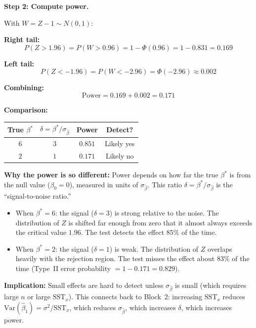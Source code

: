 \documentclass[11pt,a4paper]{article}
\begin{document}
\begin{enumerate}[label=(\alph*)]
\begin{solution}
\textbf{Step 2: Compute power.}

With $W = Z - 1 \sim N(0,1)$:

\textbf{Right tail:}
\[
  P(Z > 1.96) = P(W > 0.96) = 1 - \Phi(0.96) = 1 - 0.831 = 0.169
\]

\textbf{Left tail:}
\[
  P(Z < -1.96) = P(W < -2.96) = \Phi(-2.96) \approx 0.002
\]

\textbf{Combining:}
\[
  \text{Power} = 0.169 + 0.002 = \boxed{0.171}
\]

\textbf{Comparison:}

\medskip
\begin{center}
\begin{tabular}{cccc}
\toprule
True $\beta^*$ & $\delta = \beta^*/\sigma_{\hat{\beta}}$ & Power & Detect? \\
\midrule
$6$ & $3$ & $0.851$ & Likely yes \\
$2$ & $1$ & $0.171$ & Likely no \\
\bottomrule
\end{tabular}
\end{center}

\medskip
\textbf{Why the power is so different:} Power depends on how far the true $\beta^*$ is from the null value ($\beta_0 = 0$), measured in units of $\sigma_{\hat{\beta}}$. This ratio $\delta = \beta^*/\sigma_{\hat{\beta}}$ is the ``signal-to-noise ratio.''

\begin{itemize}
  \item When $\beta^* = 6$: the signal ($\delta = 3$) is strong relative to the noise. The distribution of $Z$ is shifted far enough from zero that it almost always exceeds the critical value $1.96$. The test detects the effect 85\% of the time.

  \item When $\beta^* = 2$: the signal ($\delta = 1$) is weak. The distribution of $Z$ overlaps heavily with the rejection region. The test misses the effect about 83\% of the time (Type~II error probability $= 1 - 0.171 = 0.829$).
\end{itemize}

\textbf{Implication:} Small effects are hard to detect unless $\sigma_{\hat{\beta}}$ is small (which requires large $n$ or large $\text{SST}_x$). This connects back to Block~2: increasing $\text{SST}_x$ reduces $\text{Var}(\hat{\beta}_1) = \sigma^2/\text{SST}_x$, which reduces $\sigma_{\hat{\beta}}$, which increases $\delta$, which increases power.
\end{solution}

\end{enumerate}
\end{document}
